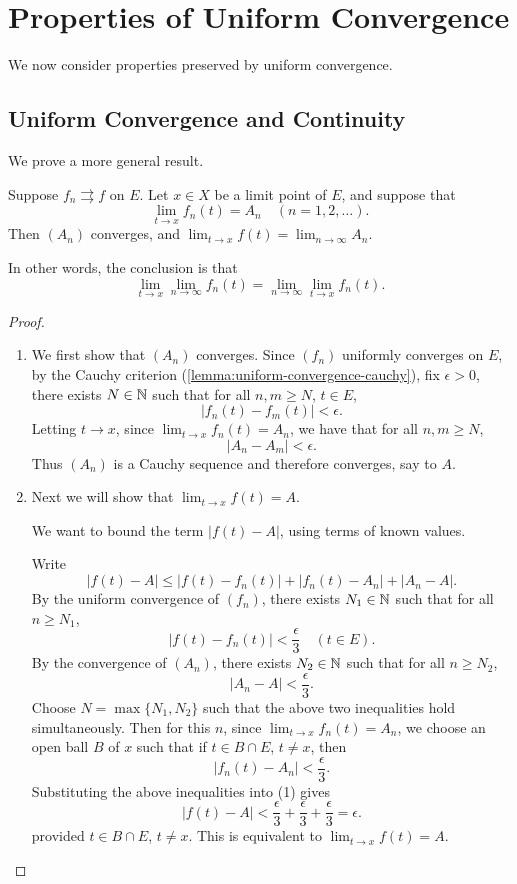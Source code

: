 \section{Properties of Uniform Convergence}
We now consider properties preserved by uniform convergence.

\subsection{Uniform Convergence and Continuity}
We prove a more general result.

\begin{proposition}\label{prop:uniform-convergence-continuity}
Suppose $f_n\rightrightarrows f$ on $E$. Let $x\in X$ be a limit point of $E$, and suppose that
\[\lim_{t\to x}f_n(t)=A_n\quad(n=1,2,\dots).\]
Then $(A_n)$ converges, and $\displaystyle\lim_{t\to x}f(t)=\lim_{n\to\infty}A_n$.
\end{proposition}

In other words, the conclusion is that
\[\lim_{t\to x}\lim_{n\to\infty}f_n(t)=\lim_{n\to\infty}\lim_{t\to x}f_n(t).\]

\begin{proof} \
\begin{enumerate}
\item We first show that $(A_n)$ converges. Since $(f_n)$ uniformly converges on $E$, by the Cauchy criterion (\ref{lemma:uniform-convergence-cauchy}), fix $\epsilon>0$, there exists $N\in\mathbb N$ such that for all $n,m\ge N$, $t\in E$,
\[|f_n(t)-f_m(t)|<\epsilon.\]
Letting $t\to x$, since $\displaystyle\lim_{t\to x}f_n(t)=A_n$, we have that for all $n,m\ge N$,
\[|A_n-A_m|<\epsilon.\]
Thus $(A_n)$ is a Cauchy sequence and therefore converges, say to $A$.

\item Next we will show that $\displaystyle\lim_{t\to x}f(t)=A$.
\begin{idea}
We want to bound the term $|f(t)-A|$, using terms of known values.
\end{idea}
Write
\begin{equation*}\tag{1}
|f(t)-A|\le|f(t)-f_n(t)|+|f_n(t)-A_n|+|A_n-A|.
\end{equation*}
By the uniform convergence of $(f_n)$, there exists $N_1\in\mathbb N$ such that for all $n\ge N_1$,
\[|f(t)-f_n(t)|<\frac{\epsilon}{3}\quad(t\in E).\]
By the convergence of $(A_n)$, there exists $N_2\in\mathbb N$ such that for all $n\ge N_2$,
\[|A_n-A|<\frac{\epsilon}{3}.\]
Choose $N=\max\{N_1,N_2\}$ such that the above two inequalities hold simultaneously. 
Then for this $n$, since $\displaystyle\lim_{t\to x}f_n(t)=A_n$, we choose an open ball $B$ of $x$ such that if $t\in B\cap E$, $t\neq x$, then
\[|f_n(t)-A_n|<\frac{\epsilon}{3}.\]
Substituting the above inequalities into (1) gives
\[|f(t)-A|<\frac{\epsilon}{3}+\frac{\epsilon}{3}+\frac{\epsilon}{3}=\epsilon.\]
provided $t\in B\cap E$, $t\neq x$. This is equivalent to $\displaystyle\lim_{t\to x}f(t)=A$.
\end{enumerate}
\end{proof}

